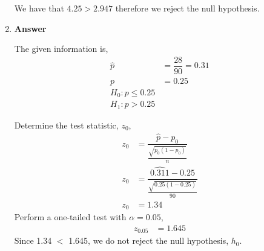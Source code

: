 \documentclass[12pt]{book}
\begin{document}
\begin{enumerate}
    We have that $4.25 > 2.947$ therefore we reject the null hypothesis.
    
    \newpage
    
    \item \textbf{Answer}
    
    The given information is,
    \begin{align*}
        \hat{p} &= \dfrac{28}{90} = 0.31\\
        p &= 0.25\\
        H_0 : p \leq 0.25\\
        H_1 : p > 0.25
    \end{align*}
    
    Determine the test statistic, $z_0$,
    \begin{align*}
        z_0 &= \dfrac{\hat{p} - p_0}{\frac{\sqrt{p_0(1 - p_0)}}{n}}\\
        z_0 &= \dfrac{\hat{0.311} - 0.25}{\frac{\sqrt{0.25(1 - 0.25)}}{90}}\\
        z_0 &= 1.34
    \end{align*}
    Perform a one-tailed test with $\alpha = 0.05$,
    \begin{align*}
        z_{0.05} &= 1.645
    \end{align*}
    Since 1.34 $<$ 1.645, we do not reject the null hypothesis, $h_0$.
    
    
    
    
    
    
    

\end{enumerate}
\end{document}
